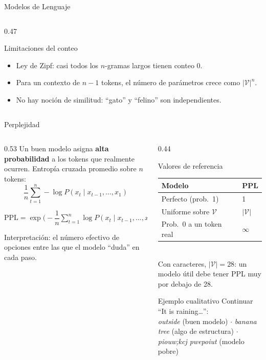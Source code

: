 \documentclass[aspectratio=169, 10pt]{beamer}
\newcommand{\V}{\mathcal{V}}
\newcommand{\formula}[1]{%
	\begin{tcolorbox}[colback=UCMBlue!8, colframe=UCMBlue, arc=4pt,
		boxsep=2pt, left=6pt, right=6pt, top=3pt, bottom=3pt]
		#1
	\end{tcolorbox}
}
\begin{document}
\begin{frame}[shrink]{Modelos de Lenguaje}
\begin{columns}[T]
\begin{column}{0.47\textwidth}
			\begin{alertblock}{Limitaciones del conteo}
				\small
				\begin{itemize}
					\item Ley de Zipf: casi todos los $n$-gramas largos tienen conteo 0.
					\item Para un contexto de $n-1$ tokens, el n\'umero de par\'ametros crece como $|\V|^n$.
					\item No hay noci\'on de similitud: ``gato'' y ``felino'' son independientes.
				\end{itemize}
			\end{alertblock}
		\end{column}
	\end{columns}

\end{frame}

\begin{frame}{Perplejidad}

	\begin{columns}[T]
		\begin{column}{0.53\textwidth}
			\small
			Un buen modelo asigna \textbf{alta probabilidad} a los tokens que realmente ocurren. Entrop\'ia cruzada promedio sobre $n$ tokens:
			\[
				\frac{1}{n}\sum_{t=1}^{n} -\log P(x_t \mid x_{t-1},\ldots,x_1)
			\]
			\formula{\centering $\mathrm{PPL} = \exp\Big(-\dfrac{1}{n}\displaystyle\sum_{t=1}^{n}\log P(x_t \mid x_{t-1},\ldots,x_1)\Big)$}
			Interpretaci\'on: el n\'umero efectivo de opciones entre las que el modelo ``duda'' en cada paso.
		\end{column}

		\begin{column}{0.44\textwidth}
			\begin{block}{Valores de referencia}
				\small
				\begin{tabular}{@{}ll@{}}
					\toprule
					Modelo & PPL \\
					\midrule
					Perfecto (prob.\ 1) & 1 \\
					Uniforme sobre $\V$ & $|\V|$ \\
					Prob.\ 0 a un token real & $\infty$ \\
					\bottomrule
				\end{tabular}
				\\[3pt]
				\scriptsize Con caracteres, $|\V|=28$: un modelo \'util debe tener PPL muy por debajo de 28.
			\end{block}

			\begin{block}{Ejemplo cualitativo}
				\scriptsize
				Continuar ``It is raining\ldots'':\\
				\textit{outside} (buen modelo) $\cdot$ \textit{banana tree} (algo de estructura) $\cdot$ \textit{piouw;kcj pwepoiut} (modelo pobre)
			\end{block}
		\end{column}
	\end{columns}

\end{frame}
\end{document}
